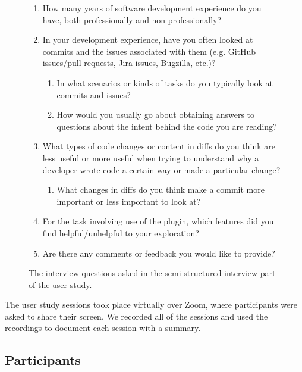 \begin{figure}[h]
  \begin{mdframed}
    \footnotesize
    \begin{enumerate}
      \item How many years of software development experience do you have, both professionally and non-professionally?
      \item In your development experience, have you often looked at commits and the issues associated with them (e.g. GitHub issues/pull requests, Jira issues, Bugzilla, etc.)?
          \begin{enumerate}
              \item In what scenarios or kinds of tasks do you typically look at commits and issues?
              \item How would you usually go about obtaining answers to questions about the intent behind the code you are reading?
          \end{enumerate}
      \item What types of code changes or content in diffs do you think are less useful or more useful when trying to understand why a developer wrote code a certain way or made a particular change? 
          \begin{enumerate}
              \item What changes in diffs do you think make a commit more important or less important to look at?
          \end{enumerate}
      \item For the task involving use of the plugin, which features did you find helpful/unhelpful to your exploration?
      \item Are there any comments or feedback you would like to provide?
    \end{enumerate}
\end{mdframed}
  \caption{The interview questions asked in the semi-structured interview part of the user study.}
  \label{fig:Interview-Questions}
\end{figure}

The user study sessions took place virtually over Zoom, where participants were asked to share their screen.
We recorded all of the sessions and used the recordings to document each session with a summary.

\subsection{Participants}

